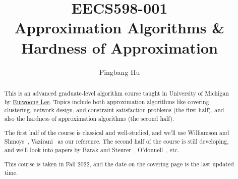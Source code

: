 \documentclass[a4paper]{report}
\author{Pingbang Hu}
\title{EECS598-001\\Approximation Algorithms \& Hardness of Approximation}
\begin{document}
\maketitle

\begin{abstract}
	This is an advanced graduate-level algorithm course taught in University of Michigan by \href{https://web.eecs.umich.edu/~euiwoong/}{Euiwoong Lee}. Topics include both approximation algorithms like covering, clustering, network design, and constraint satisfaction problems (the first half), and also the hardness of approximation algorithms (the second half).

	The first half of the course is classical and well-studied, and we'll use Williamson and Shmoys~\cite{williamson2011design}, Vazirani~\cite{vazirani2002approximation} as our reference. The second half of the course is still developing, and we'll look into papers by Barak and Steurer~\cite{https://doi.org/10.48550/arxiv.1404.5236}, O'donnell~\cite{https://doi.org/10.48550/arxiv.2105.10386}, etc.

	This course is taken in Fall 2022, and the date on the covering page is the last updated time.
\end{abstract}

\tableofcontents


\newpage
\appendix
\appendixpage



\newpage
\printbibliography
\end{document}
